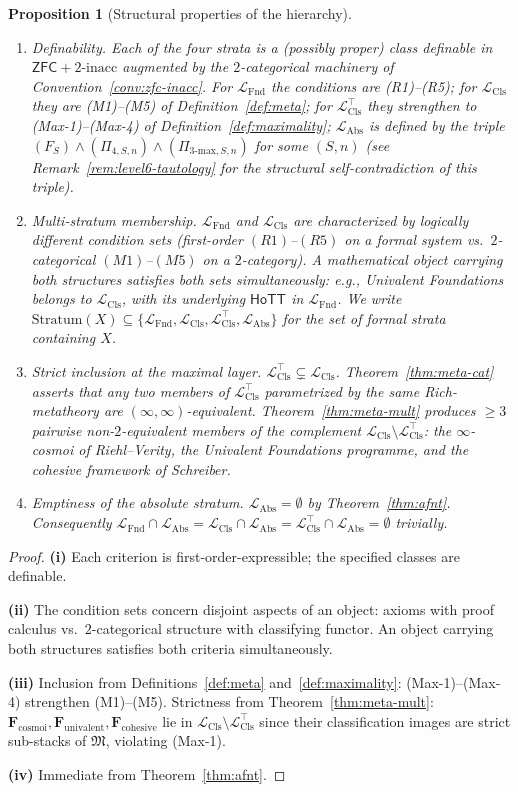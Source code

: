 \documentclass[11pt]{article}
\theoremstyle{plain}
\newtheorem{proposition}[theorem]{Proposition}
\theoremstyle{definition}
\newcommand{\fM}{\mathfrak{M}}
\newcommand{\LFnd}{\mathcal{L}_{\mathrm{Fnd}}}
\newcommand{\LCls}{\mathcal{L}_{\mathrm{Cls}}}
\newcommand{\LClsMax}{\mathcal{L}_{\mathrm{Cls}}^{\top}}
\newcommand{\LAbs}{\mathcal{L}_{\mathrm{Abs}}}
\newcommand{\ZFC}{\mathsf{ZFC}}
\newcommand{\HoTT}{\mathsf{HoTT}}
\begin{document}
\begin{proposition}[Structural properties of the hierarchy]\label{prop:level-structure}
\begin{enumerate}
\item[\textbf{(i)}] \emph{Definability.} Each of the four strata is a (possibly proper) class definable in $\ZFC + 2\text{-inacc}$ augmented by the $2$-categorical machinery of Convention~\ref{conv:zfc-inacc}. For $\LFnd$ the conditions are (R1)--(R5); for $\LCls$ they are (M1)--(M5) of Definition~\ref{def:meta}; for $\LClsMax$ they strengthen to (Max-1)--(Max-4) of Definition~\ref{def:maximality}; $\LAbs$ is defined by the triple $(F_S) \wedge (\Pi_{4, S, n}) \wedge (\Pi_{3\text{-max}, S, n})$ for some $(S, n)$ (see Remark~\ref{rem:level6-tautology} for the structural self-contradiction of this triple).
\item[\textbf{(ii)}] \emph{Multi-stratum membership.} $\LFnd$ and $\LCls$ are characterized by logically different condition sets (first-order $(R1)$--$(R5)$ on a formal system vs.\ $2$-categorical $(M1)$--$(M5)$ on a $2$-category). A mathematical object carrying both structures satisfies both sets simultaneously: e.g., Univalent Foundations belongs to $\LCls$, with its underlying $\HoTT$ in $\LFnd$. We write $\mathrm{Stratum}(X) \subseteq \{\LFnd, \LCls, \LClsMax, \LAbs\}$ for the set of formal strata containing $X$.
\item[\textbf{(iii)}] \emph{Strict inclusion at the maximal layer.} $\LClsMax \subsetneq \LCls$. Theorem~\ref{thm:meta-cat} asserts that any two members of $\LClsMax$ parametrized by the same Rich-metatheory are $(\infty, \infty)$-equivalent. Theorem~\ref{thm:meta-mult} produces $\geq 3$ pairwise non-$2$-equivalent members of the complement $\LCls \setminus \LClsMax$: the $\infty$-cosmoi of Riehl--Verity, the Univalent Foundations programme, and the cohesive framework of Schreiber.
\item[\textbf{(iv)}] \emph{Emptiness of the absolute stratum.} $\LAbs = \emptyset$ by Theorem~\ref{thm:afnt}. Consequently $\LFnd \cap \LAbs = \LCls \cap \LAbs = \LClsMax \cap \LAbs = \emptyset$ trivially.
\end{enumerate}
\end{proposition}

\begin{proof}
\textbf{(i)} Each criterion is first-order-expressible; the specified classes are definable.

\textbf{(ii)} The condition sets concern disjoint aspects of an object: axioms with proof calculus vs.\ $2$-categorical structure with classifying functor. An object carrying both structures satisfies both criteria simultaneously.

\textbf{(iii)} Inclusion from Definitions~\ref{def:meta} and~\ref{def:maximality}: (Max-1)--(Max-4) strengthen (M1)--(M5). Strictness from Theorem~\ref{thm:meta-mult}: $\mathbf{F}_{\mathrm{cosmoi}}, \mathbf{F}_{\mathrm{univalent}}, \mathbf{F}_{\mathrm{cohesive}}$ lie in $\LCls \setminus \LClsMax$ since their classification images are strict sub-stacks of $\fM$, violating (Max-1).

\textbf{(iv)} Immediate from Theorem~\ref{thm:afnt}.
\end{proof}
\end{document}
